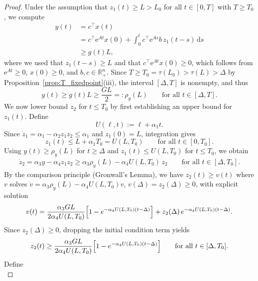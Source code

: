 \documentclass{article}
\newcommand{\e}{\mbox{e}}
\begin{document}
\begin{proof}
    Under the assumption that $z_1(t)\ge L>L_0$ for all $t\in[0,T]$ with 
    $T\ge T_0$, we compute
    \begin{align*}
        y(t) &= c^\top x(t)\\
        &= c^\top \e^{At}x(0)+\int_0^t c^\top\e^{As}b\,z_1(t-s)\,\mathrm{d}s \\
        &\ge g(t)L,
    \end{align*}
    where we used that $z_1(t-s)\ge L$ and that $c^\top \e^{At}x(0)\geq0$, which follows from    
    $\e^{At}\ge 0$, $x(0)\ge 0$,  and $b,c\in\mathbb{R}_+^n$. 
    Since $T\ge T_0=\tau(L_0)>\tau(L)>\Delta$ by 
    Proposition~\ref{prop:T_fixedpoint}(iii), the interval $[\Delta,T]$ is 
    nonempty, and thus
    \begin{equation}\label{eq:y_low}
        y(t) \ge g(t)L \ge \frac{GL}{2} =:\rho_y(L)
        \qquad\text{for all } t\in[\Delta,T].
    \end{equation}
    We now lower bound $z_2$ for $t\le T_0$ by first establishing an upper bound for $z_1(t)$. 
    Define 
    \[
        U(\ell,t):=\ell+\alpha_1t.
    \]
    Since $\dot z_1 = \alpha_1 - \alpha_2 z_1 z_2 \le \alpha_1$ and $z_1(0) = L$, integration gives
    \[
        z_1(t) \le L + \alpha_1 T_0 = U(L,T_0)
        \qquad\text{for all } t\in[0,T_0].
    \]
    Using $y(t)\ge \rho_y(L)$ for $t\ge\Delta$ 
    and $z_1(t)\le U(L,T_0)$ for $t\le T_0$, we obtain 
    \begin{align*}
        \dot z_2 = \alpha_3 y - \alpha_4 z_1 z_2 
        \ge \alpha_3 \rho_y(L) - \alpha_4 U(L,T_0)\,z_2
        \qquad\text{for all } t\in[\Delta,T_0].
    \end{align*}
    By the comparison principle (Gronwall's Lemma), we have $z_2(t)\ge v(t)$ where $v$ solves
    $\dot v = \alpha_3\rho_y(L) - \alpha_4 U(L,T_0)v$, $v(\Delta)=z_2(\Delta)\ge 0$,
    with explicit solution
    \begin{equation*}
        v(t) = \frac{\alpha_3 GL}{2\alpha_4 U(L,T_0)}
        \Bigl[1-e^{-\alpha_4 U(L,T_0)(t-\Delta)}\Bigr]
        + z_2(\Delta)\,e^{-\alpha_4 U(L,T_0)(t-\Delta)}.
    \end{equation*}
    Since $z_2(\Delta)\ge 0$, dropping the initial condition term yields
    \begin{equation}\label{eq:z2_low}
        z_2(t) \ge \frac{\alpha_3 GL}{2\alpha_4 U(L,T_0)}
        \Bigl[1-e^{-\alpha_4 U(L,T_0)(t-\Delta)}\Bigr]
        \qquad\text{for all } t\in[\Delta,T_0].
    \end{equation}
    Define
    \[
\]
\end{proof}
\end{document}
